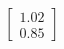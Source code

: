 \documentclass[preview]{standalone}
\begin{document}
\begin{align*}
\begin{bmatrix} 1.02 \\ 0.85 \end{bmatrix}
\end{align*}
\end{document}
